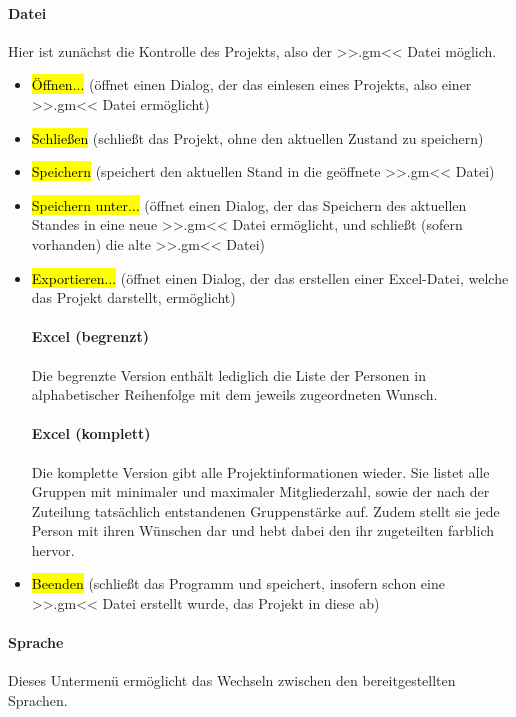 \paragraph{Datei} Hier ist zunächst die Kontrolle des Projekts, also der >>.gm<< Datei  möglich.
\begin{itemize}
	\item \hl{Öffnen...} (öffnet einen Dialog, der das einlesen eines Projekts, also einer >>.gm<< Datei ermöglicht)
	\item \hl{Schließen} (schließt das Projekt, ohne den aktuellen Zustand zu speichern)
	\item \hl{Speichern} (speichert den aktuellen Stand in die geöffnete >>.gm<< Datei)
	\item \hl{Speichern unter...} (öffnet einen Dialog, der das Speichern des aktuellen Standes in eine neue >>.gm<< Datei ermöglicht, und schließt (sofern vorhanden) die alte >>.gm<< Datei)
	\item \hl{Exportieren...} (öffnet einen Dialog, der das erstellen einer Excel-Datei, welche das Projekt darstellt, ermöglicht)
	\paragraph{Excel (begrenzt)} Die begrenzte Version enthält lediglich die Liste der Personen in alphabetischer Reihenfolge mit dem jeweils zugeordneten Wunsch.
	\paragraph{Excel (komplett)} Die komplette Version gibt alle Projektinformationen wieder. Sie listet alle Gruppen mit minimaler und maximaler Mitgliederzahl, sowie der nach der Zuteilung tatsächlich entstandenen Gruppenstärke auf. Zudem stellt sie jede Person mit ihren Wünschen dar und hebt dabei den ihr zugeteilten farblich hervor.
	\item \hl{Beenden} (schließt das Programm und speichert, insofern schon eine >>.gm<< Datei erstellt wurde, das Projekt in diese ab)
\end{itemize}

\paragraph{Sprache} Dieses Untermenü ermöglicht das Wechseln zwischen den bereitgestellten Sprachen.

